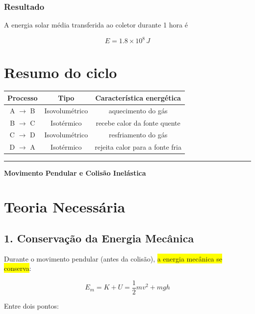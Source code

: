 \documentclass[a4paper,12pt]{article}
\begin{document}
\subsubsection*{Resultado}

A energia solar média transferida ao coletor durante 1 hora é

\[
\boxed{E = 1.8 \times 10^{8}\,J}
\]

\section*{Resumo do ciclo}

\begin{center}
\begin{tabular}{c c c}
Processo & Tipo & Característica energética \\
\hline
A $\rightarrow$ B & Isovolumétrico & aquecimento do gás \\
B $\rightarrow$ C & Isotérmico & recebe calor da fonte quente \\
C $\rightarrow$ D & Isovolumétrico & resfriamento do gás \\
D $\rightarrow$ A & Isotérmico & rejeita calor para a fonte fria \\
\end{tabular}
\end{center}

\noindent\rule{\textwidth}{1pt}

\begin{center}
\Large \textbf{Movimento Pendular e Colisão Inelástica}
\end{center}

\vspace{0.5cm}

\section*{Teoria Necessária}

\subsection*{1. Conservação da Energia Mecânica}

Durante o movimento pendular (antes da colisão), \colorbox{yellow}{a energia mecânica se conserva}:

\begin{equation}
E_m = K + U = \frac{1}{2}mv^2 + mgh
\end{equation}

Entre dois pontos:
\end{document}
